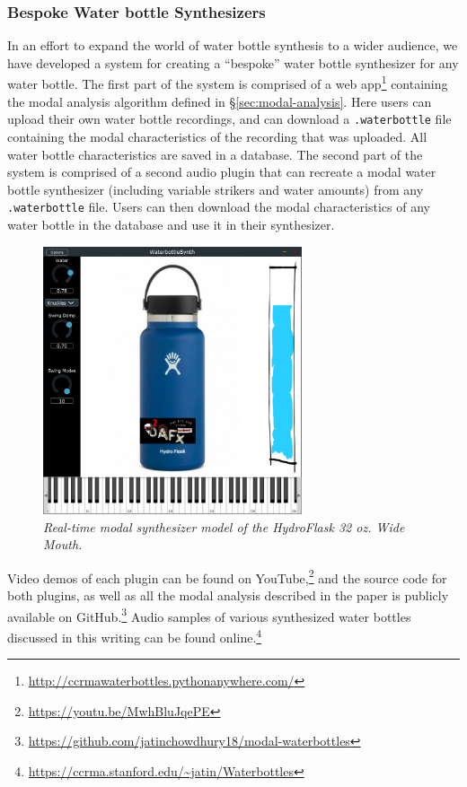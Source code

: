 \documentclass[twoside,a4paper]{article}
\begin{document}
\subsubsection{Bespoke Water bottle Synthesizers}
In an effort to expand the world of water bottle synthesis to a wider
audience, we have developed a system for creating a ``bespoke''
water bottle synthesizer for any water bottle. The first part of the
system is comprised of a web app\footnote{\url{http://ccrmawaterbottles.pythonanywhere.com/}}
containing the modal analysis algorithm defined in \S\ref{sec:modal-analysis}. 
Here users can upload their own water bottle recordings, and can download a
\texttt{.waterbottle} file containing the modal characteristics of the
recording that was uploaded. All water bottle characteristics are saved in 
a database. The second part of the system is comprised of
a second audio plugin that can recreate a modal water bottle synthesizer
(including variable strikers and water amounts) from any \texttt{.waterbottle}
file. Users can then download the modal characteristics of any water
bottle in the database and use it in their synthesizer.
%
\begin{figure}
    \centering
    \includegraphics[width=3in]{../Figures/WaterbottleSynthPlugin.png}
    \caption{\it{Real-time modal synthesizer model of the HydroFlask
    32 oz. Wide Mouth.}}
    \label{fig:plugin}
\end{figure}

Video demos of each plugin can be found on
YouTube,\footnote{\url{https://youtu.be/MwhBluJqePE}}
and the source code for both plugins, as well as all the modal
analysis described in the paper is publicly available on
GitHub.\footnote{\url{https://github.com/jatinchowdhury18/modal-waterbottles}}
Audio samples of various synthesized water bottles discussed in this
writing can be found online.\footnote{\url{https://ccrma.stanford.edu/~jatin/Waterbottles}}
\end{document}
